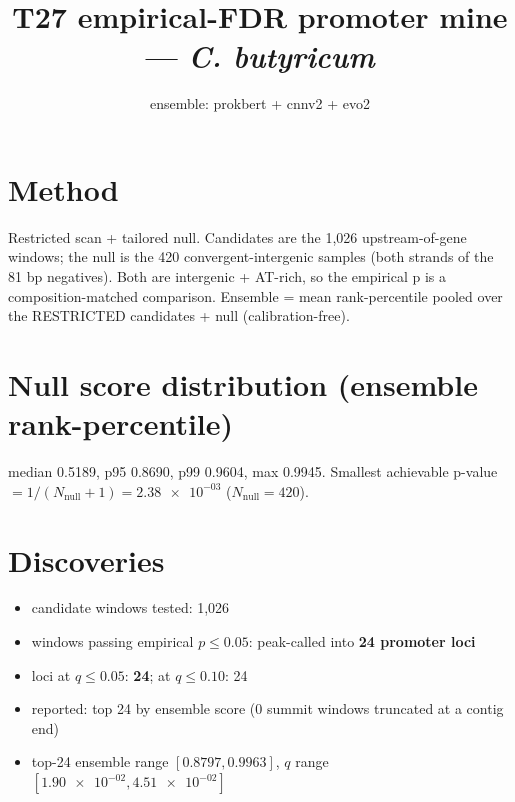 \documentclass{article}
\title{T27 empirical-FDR promoter mine --- \textit{C. butyricum}}
\date{ensemble: prokbert + cnnv2 + evo2}
\begin{document}
\maketitle

\section*{Method}
Restricted scan + tailored null. Candidates are the 1,026 upstream-of-gene windows; the null is the 420 convergent-intergenic samples (both strands of the 81 bp negatives). Both are intergenic + AT-rich, so the empirical p is a composition-matched comparison. Ensemble = mean rank-percentile pooled over the RESTRICTED candidates + null (calibration-free).

\section*{Null score distribution (ensemble rank-percentile)}
median 0.5189, p95 0.8690, p99 0.9604, max 0.9945.
Smallest achievable p-value $= 1/(N_{\mathrm{null}}+1) = \num{2.38e-03}$
($N_{\mathrm{null}} = 420$).

\section*{Discoveries}
\begin{itemize}
  \item candidate windows tested: 1,026
  \item windows passing empirical $p \le 0.05$: peak-called into \textbf{24 promoter loci}
  \item loci at $q \le 0.05$: \textbf{24}; at $q \le 0.10$: 24
  \item reported: top 24 by ensemble score (0 summit windows truncated at a contig end)
  \item top-24 ensemble range $[0.8797, 0.9963]$, $q$ range $[\num{1.90e-02}, \num{4.51e-02}]$
\end{itemize}
\end{document}
